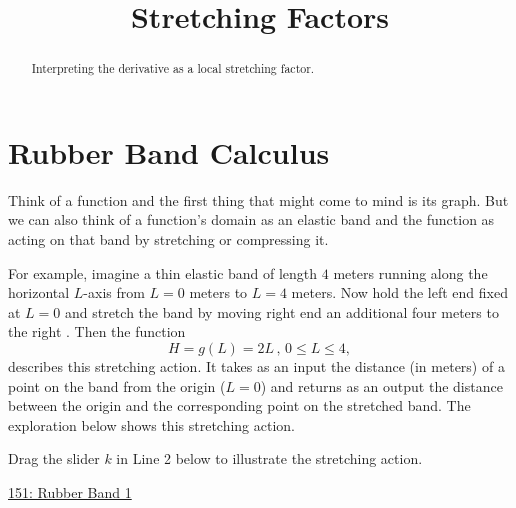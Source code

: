 \documentclass{ximera}
\title{Stretching Factors}
\begin{document}
\begin{abstract}
Interpreting the derivative as a local stretching factor.
\end{abstract}
\maketitle

\section{Rubber Band Calculus}

Think of a function and the first thing that might come to mind is its graph. But we can also think of a function's domain as an elastic band and the function as acting on that band by stretching or compressing it. %

For example, imagine a thin elastic band of length $4$ meters running along the horizontal $L$-axis from $L=0$ meters to $L=4$ meters.  Now hold the left end fixed at $L=0$ and stretch the band by moving right end an additional four meters to the right . Then the function
\[
      H = g(L) = 2L \, , \, 0\leq L \leq 4 ,
\]
describes this stretching action. It takes as an input the distance (in meters) of a point on the band from the origin ($L=0$) and returns as an output the distance between the origin and the corresponding point on the stretched band. The exploration below shows this stretching action.

\begin{exploration} \label{Ex:98f3rgafgbb}
Drag the slider $k$ in Line 2 below to illustrate the stretching action.

\begin{onlineOnly}
    \begin{center}
\end{center}
\end{onlineOnly}

\href{https://www.desmos.com/calculator/qejivz36ui}{151: Rubber Band 1}

\end{exploration}
\end{document}
